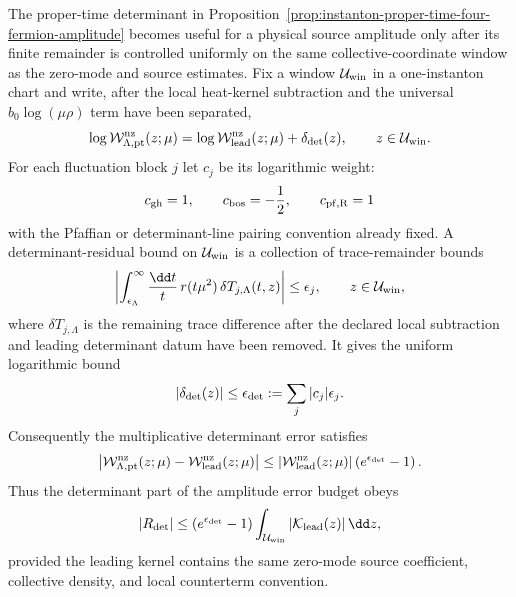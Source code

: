 \begin{controlledapproximation}
\label{ca:instanton-proper-time-determinant-residual-window}
The proper-time determinant in
Proposition~\ref{prop:instanton-proper-time-four-fermion-amplitude} becomes
useful for a physical source amplitude only after its finite remainder is
controlled uniformly on the same collective-coordinate window as the
zero-mode and source estimates.  Fix a window \(\mathcal U_{\rm win}\) in a
one-instanton chart and write, after the local heat-kernel subtraction and
the universal \(b_0\log(\mu\rho)\) term have been separated,
\[
  \log\mathcal W_{\Lambda,{\rm pt}}^{\rm nz}(z;\mu)
  =
  \log\mathcal W_{{\rm lead}}^{\rm nz}(z;\mu)
  +\delta_{\rm det}(z),
  \qquad z\in\mathcal U_{\rm win}.
\]
For each fluctuation block \(j\) let \(c_j\) be its logarithmic weight:
\[
  c_{\rm gh}=1,\qquad c_{\rm bos}=-\frac12,\qquad
  c_{\rm pf,R}=1
\]
with the Pfaffian or determinant-line pairing convention already fixed.  A
determinant-residual bound on \(\mathcal U_{\rm win}\) is a collection
of trace-remainder bounds
\[
  \left|
    \int_{\epsilon_\Lambda}^{\infty}
    \frac{\dd t}{t}\,r(t\mu^2)\,
    \delta T_{j,\Lambda}(t,z)
  \right|
  \le \epsilon_j,
  \qquad z\in\mathcal U_{\rm win},
\]
where \(\delta T_{j,\Lambda}\) is the remaining trace difference after the
declared local subtraction and leading determinant datum have been removed.
It gives the uniform logarithmic bound
\begin{equation}
  |\delta_{\rm det}(z)|
  \le
  \epsilon_{\rm det}:=\sum_j |c_j|\epsilon_j .
  \label{eq:instanton-proper-time-determinant-log-bound}
\end{equation}
Consequently the multiplicative determinant error satisfies
\begin{equation}
  \left|
    \mathcal W_{\Lambda,{\rm pt}}^{\rm nz}(z;\mu)
    -
    \mathcal W_{{\rm lead}}^{\rm nz}(z;\mu)
  \right|
  \le
  \left|\mathcal W_{{\rm lead}}^{\rm nz}(z;\mu)\right|
  \left(e^{\epsilon_{\rm det}}-1\right).
  \label{eq:instanton-proper-time-determinant-multiplicative-bound}
\end{equation}
Thus the determinant part of the amplitude error budget obeys
\begin{equation}
  |R_{\rm det}|
  \le
  \left(e^{\epsilon_{\rm det}}-1\right)
  \int_{\mathcal U_{\rm win}}
  |\mathcal K_{\rm lead}(z)|\,\dd z ,
  \label{eq:instanton-proper-time-determinant-amplitude-bound}
\end{equation}
provided the leading kernel contains the same zero-mode source coefficient,
collective density, and local counterterm convention.


\end{controlledapproximation}

